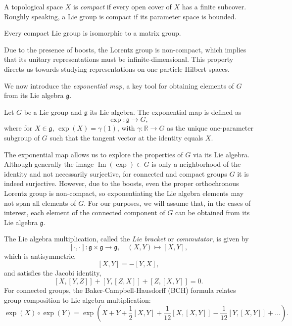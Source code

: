 \begin{definition}
A topological space $X$ is \emph{compact} if every open cover of $X$ has a finite subcover. Roughly speaking, a Lie group is compact if its parameter space is bounded.
\end{definition}

\begin{theorem}
Every compact Lie group is isomorphic to a matrix group.
\end{theorem}

Due to the presence of boosts, the Lorentz group is non-compact, which implies that its unitary representations must be infinite-dimensional. This property directs us towards studying representations on one-particle Hilbert spaces.

We now introduce the \emph{exponential map}, a key tool for obtaining elements of $G$ from its Lie algebra $\mathfrak{g}$.

\begin{definition}
Let $G$ be a Lie group and $\mathfrak{g}$ its Lie algebra. The exponential map is defined as
\[
\exp: \mathfrak{g} \to G,
\]
where for $X \in \mathfrak{g}$, $\exp(X) = \gamma(1)$, with $\gamma : \mathbb{R} \to G$ as the unique one-parameter subgroup of $G$ such that the tangent vector at the identity equals $X$.
\end{definition}

The exponential map allows us to explore the properties of $G$ via its Lie algebra. Although generally the image $\operatorname{Im}(\exp) \subset G$ is only a neighborhood of the identity and not necessarily surjective, for connected and compact groups $G$ it is indeed surjective. However, due to the boosts, even the proper orthochronous Lorentz group is non-compact, so exponentiating the Lie algebra elements may not span all elements of $G$. For our purposes, we will assume that, in the cases of interest, each element of the connected component of $G$ can be obtained from its Lie algebra $\mathfrak{g}$.

The Lie algebra multiplication, called the \emph{Lie bracket} or \emph{commutator}, is given by
\[
[ \cdot, \cdot ] : \mathfrak{g} \times \mathfrak{g} \to \mathfrak{g}, \quad (X, Y) \mapsto [X, Y],
\]
which is antisymmetric,
\[
[X, Y] = -[Y, X],
\]
and satisfies the Jacobi identity,
\[
[X, [Y, Z]] + [Y, [Z, X]] + [Z, [X, Y]] = 0.
\]
For connected groups, the Baker-Campbell-Hausdorff (BCH) formula relates group composition to Lie algebra multiplication:
\[
\exp(X) \circ \exp(Y) = \exp \left( X + Y + \frac{1}{2}[X, Y] + \frac{1}{12}[X, [X, Y]] - \frac{1}{12}[Y, [X, Y]] + \dots \right).
\]

